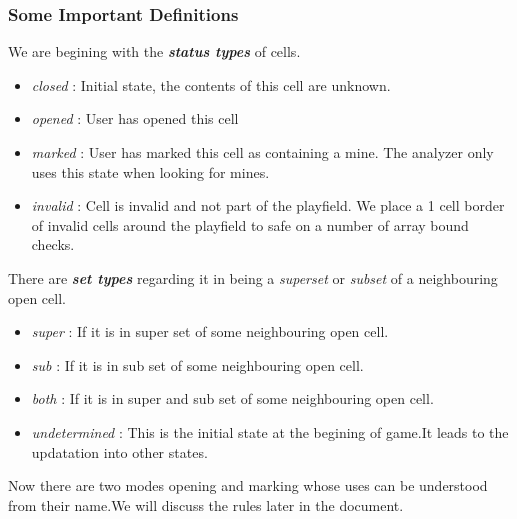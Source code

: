 \documentclass[12pt,a4paper]{report}
\begin{document}
\subsubsection*{Some Important Definitions}
 We are begining with the \textbf{\textit{status types}} of cells.
\begin{itemize}
\item[]\textit{closed} : Initial state, the contents of this cell are unknown.
\item[]\textit{opened} : User has opened this cell
\item[]\textit{marked} : User has marked this cell as containing a mine. The analyzer only uses this state when looking for mines.
\item[]\textit{invalid} : Cell is invalid and not part of the playfield. We place a 1 cell border of invalid cells around the playfield to safe on a number of array bound checks.
\end{itemize}
There are \textbf{\textit{set types}} regarding it in being a \textit{superset} or \textit{subset} of a neighbouring open cell.
\begin{itemize}
\item[]\textit{super} : If it is in super set of some neighbouring open cell.
\item[]\textit{sub} : If it is in sub set of some neighbouring open cell.
\item[]\textit{both} : If it is in super and sub set of some neighbouring open cell.
\item[]\textit{undetermined} : This is the initial state at the begining of game.It leads to the updatation into other states.
\end{itemize}
Now there are two modes opening and marking whose uses can be understood from their name.We will discuss the rules later in the document.
\end{document}
